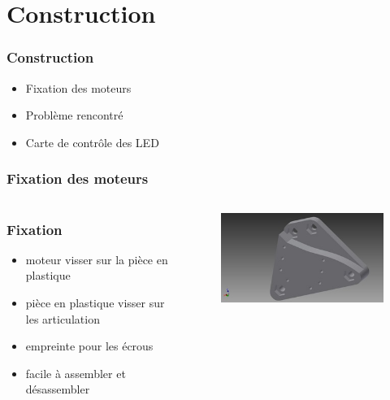 \section{Construction}

\begin{frame}
  \frametitle{Construction}
  \begin{itemize}
    \item Fixation des moteurs
    \item Problème rencontré
    \item Carte de contrôle des LED
  \end{itemize}
\end{frame}

\begin{frame}
  \frametitle{Fixation des moteurs}
  \begin{columns}[c]
    \begin{column}[T]{.5\textwidth}
      \frametitle{Fixation}
      \begin{itemize}
        \item moteur visser sur la pièce en plastique
        \item pièce en plastique visser sur les articulation
        \item empreinte pour les écrous
        \item facile à assembler et désassembler
      \end{itemize}
    \end{column}
    \begin{column}[T]{.5\textwidth}  
      \begin{figure}
        			\includegraphics[scale=1]{../img/part_middle_v1.jpg}
      \end{figure}
    \end{column}
  \end{columns}
\end{frame}

